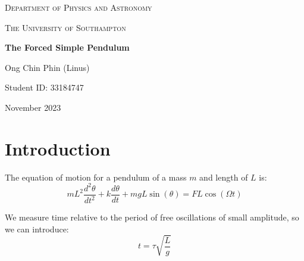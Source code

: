 \documentclass[12pt]{article}
\begin{document}
\begin{titlepage}
    \centering
    \vspace{1cm}
    {\scshape\Large Department of Physics and Astronomy \par}
    \vspace{1cm}
    {\scshape\Large The University of Southampton \par}
    \vspace{1cm}
    \vspace{1cm}
    {\huge\bfseries The Forced Simple Pendulum \par}
    \vspace{1cm}
    {\Large Ong Chin Phin (Linus) \par}
    \vspace{1cm}
    {\Large Student ID: 33184747 \par}
    \vfill
    {\large November 2023 \par}
\end{titlepage}

\newpage
\tableofcontents
\thispagestyle{empty}

\newpage
\thispagestyle{empty}
\begin{abstract}

\end{abstract}


\newpage
\setcounter{page}{1}
\section{Introduction}

The equation of motion for a pendulum of a mass $m$ and length of $L$ is:
\begin{equation}
    mL^2 \frac{d^2\theta}{dt^2} + k \frac{d\theta}{dt} + mgL\sin({\theta}) = FL\cos({\Omega}t)
    \label{oscillation}
\end{equation}

We measure time relative to the period of free oscillations of small amplitude, so we can introduce:
\begin{equation}
    t = \tau\sqrt{\frac{L}{g}}
    \label{modified time}
\end{equation}
\end{document}
